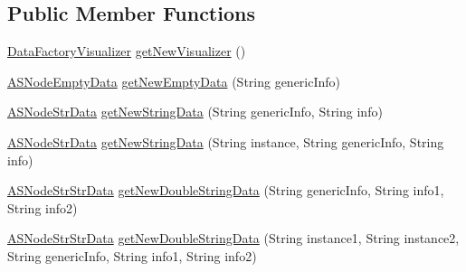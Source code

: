 \subsection*{Public Member Functions}
\begin{DoxyCompactItemize}
\item 
\hyperlink{classit_1_1emarolab_1_1cagg_1_1core_1_1language_1_1syntax_1_1abstractTree_1_1AbstractDataFactory_1_1DataFactoryVisualizer}{Data\-Factory\-Visualizer} \hyperlink{classit_1_1emarolab_1_1cagg_1_1core_1_1language_1_1syntax_1_1abstractTree_1_1AbstractDataFactory_a9c05a46a56ca0069762aeefcda1b520a}{get\-New\-Visualizer} ()
\item 
\hyperlink{classit_1_1emarolab_1_1cagg_1_1core_1_1language_1_1syntax_1_1abstractTree_1_1AbstractDataFactory_1_1ASNodeEmptyData}{A\-S\-Node\-Empty\-Data} \hyperlink{classit_1_1emarolab_1_1cagg_1_1core_1_1language_1_1syntax_1_1abstractTree_1_1AbstractDataFactory_a8f301a6c8329f3fce920307fa0624e66}{get\-New\-Empty\-Data} (String generic\-Info)
\item 
\hyperlink{classit_1_1emarolab_1_1cagg_1_1core_1_1language_1_1syntax_1_1abstractTree_1_1AbstractDataFactory_1_1ASNodeStrData}{A\-S\-Node\-Str\-Data} \hyperlink{classit_1_1emarolab_1_1cagg_1_1core_1_1language_1_1syntax_1_1abstractTree_1_1AbstractDataFactory_a66cf8165c26d5d0b5be1cf8d2c01cbdc}{get\-New\-String\-Data} (String generic\-Info, String info)
\item 
\hyperlink{classit_1_1emarolab_1_1cagg_1_1core_1_1language_1_1syntax_1_1abstractTree_1_1AbstractDataFactory_1_1ASNodeStrData}{A\-S\-Node\-Str\-Data} \hyperlink{classit_1_1emarolab_1_1cagg_1_1core_1_1language_1_1syntax_1_1abstractTree_1_1AbstractDataFactory_af6508b96083332597b52181fbbd7b3f3}{get\-New\-String\-Data} (String instance, String generic\-Info, String info)
\item 
\hyperlink{classit_1_1emarolab_1_1cagg_1_1core_1_1language_1_1syntax_1_1abstractTree_1_1AbstractDataFactory_1_1ASNodeStrStrData}{A\-S\-Node\-Str\-Str\-Data} \hyperlink{classit_1_1emarolab_1_1cagg_1_1core_1_1language_1_1syntax_1_1abstractTree_1_1AbstractDataFactory_af0caa1d3fc9a367e152975ebe3834258}{get\-New\-Double\-String\-Data} (String generic\-Info, String info1, String info2)
\item 
\hyperlink{classit_1_1emarolab_1_1cagg_1_1core_1_1language_1_1syntax_1_1abstractTree_1_1AbstractDataFactory_1_1ASNodeStrStrData}{A\-S\-Node\-Str\-Str\-Data} \hyperlink{classit_1_1emarolab_1_1cagg_1_1core_1_1language_1_1syntax_1_1abstractTree_1_1AbstractDataFactory_a644fc402b8acc7629cfc39fb8c6b0d43}{get\-New\-Double\-String\-Data} (String instance1, String instance2, String generic\-Info, String info1, String info2)

\end{DoxyCompactItemize}
